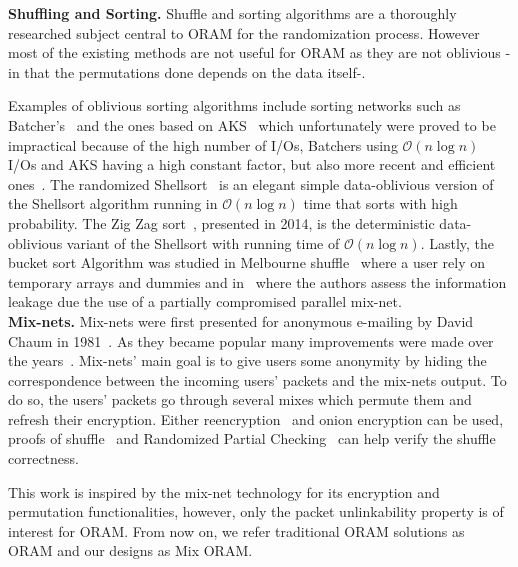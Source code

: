 \documentclass[USenglish,oneside,twocolumn]{article}
\begin{document}
\noindent\textbf{Shuffling and Sorting.}
Shuffle and sorting algorithms are a thoroughly researched subject central to ORAM for the randomization process. However most of the existing methods are not useful for ORAM as they are not oblivious -in that the permutations done depends on the data itself-.

Examples of oblivious sorting algorithms include sorting networks such as Batcher's~\cite{batcher1968sorting} and the ones based on AKS~\cite{ajtai19830} which unfortunately were proved to be impractical because of the high number of I/Os, Batchers using $\mathcal{O}\left ( n \log n \right)$ I/Os and AKS having a high constant factor, but also more recent and efficient ones~\cite{paterson1990improved}.
The randomized Shellsort~\cite{goodrich2010randomized} is an elegant simple data-oblivious version of the Shellsort algorithm running in $\mathcal{O}\left ( n \log n \right)$ time that sorts with high probability.
The Zig Zag sort~\cite{goodrich2014zig}, presented in 2014, is the deterministic data-oblivious variant of the Shellsort with running time of $\mathcal{O}\left ( n \log n\right)$.
Lastly, the bucket sort Algorithm was studied in Melbourne shuffle~\cite{ohrimenko2014melbourne} where a user rely on temporary arrays and dummies and in~\cite{goodrich2012anonymous} where the authors assess the information leakage due  the use of a partially compromised parallel mix-net.\\

\noindent\textbf{Mix-nets.}
Mix-nets were first presented for anonymous e-mailing by David Chaum in 1981~\cite{chaum1981untraceable}. As they became popular many improvements were made over the years~\cite{moller2003mixmaster,danezis2003mixminion,danezis2004minx,danezis2009sphinx}. Mix-nets' main goal is to give users some anonymity by hiding the correspondence between the incoming users' packets and the mix-nets output. To do so, the users' packets go through several mixes which permute them and refresh their encryption. Either reencryption~\cite{wikstrom2006adaptively} and onion encryption can be used, proofs of shuffle~\cite{groth2007verifiable,groth2007non,bayer2012efficient} and Randomized Partial Checking~\cite{jakobsson2002making} can help verify the shuffle correctness.

This work is inspired by the mix-net technology for its encryption and permutation functionalities, however, only the packet unlinkability property is of interest for ORAM. From now on, we refer traditional ORAM solutions as ORAM and our designs as Mix ORAM.
%
\end{document}

